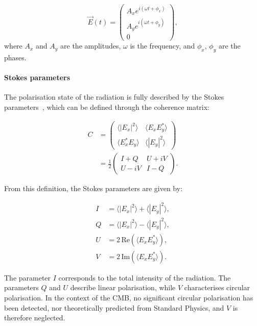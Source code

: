 \documentclass[../../thesis.tex]{subfiles}
\begin{document}
\begin{equation}
    \vec{E}(t) = 
    \begin{pmatrix} 
        A_x e^{i(\omega t + \phi_x)} \\ 
        A_y e^{i(\omega t + \phi_y)} \\ 
        0 
    \end{pmatrix},
\end{equation}
where $A_x$ and $A_y$ are the amplitudes, $\omega$ is the frequency, and $\phi_x$, $\phi_y$ are the phases.

\paragraph{Stokes parameters}

The polarisation state of the radiation is fully described by the Stokes parameters~\cite{Stokes1851}, which can be defined through the coherence matrix:

\begin{align}
    C &= 
    \begin{pmatrix} 
        \langle |E_x|^2 \rangle & \langle E_x E_y^* \rangle \\ 
        \langle E_x^* E_y \rangle & \langle |E_y|^2 \rangle 
    \end{pmatrix} \\
    &= \frac{1}{2} 
    \begin{pmatrix} 
        I + Q & U + iV \\ 
        U - iV & I - Q 
    \end{pmatrix}.
\end{align}

From this definition, the Stokes parameters are given by:

\begin{align}
    I &= \langle |E_x|^2 \rangle + \langle |E_y|^2 \rangle, \\
    Q &= \langle |E_x|^2 \rangle - \langle |E_y|^2 \rangle, \\
    U &= 2\,\mathrm{Re}\left(\langle E_x E_y^* \rangle\right), \\
    V &= 2\,\mathrm{Im}\left(\langle E_x E_y^* \rangle\right).
\end{align}

The parameter $I$ corresponds to the total intensity of the radiation. The parameters $Q$ and $U$ describe linear polarisation, while $V$ characterises circular polarisation. In the context of the CMB, no significant circular polarisation has been detected, nor theoretically predicted from Standard Physics, and $V$ is therefore neglected.
\end{document}
